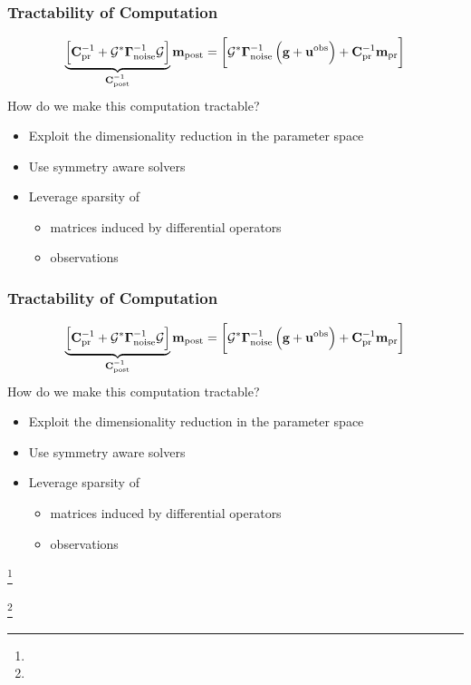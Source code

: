 \documentclass[
  pdf,
  10pt,
  xcolor={svgnames},
]{beamer}
\newcommand\blfootnote[1]{%
  \begingroup
  \renewcommand\thefootnote{}\footnote{\scriptsize #1}%
  \addtocounter{footnote}{-1}%
  \endgroup
}
\newcommand{\mc}[1]{\mathcal{#1}}
\newcommand{\mat}[1]{\mathbf{{#1}}}
\newcommand{\obs}{\mathbf{u}^{\rm obs}}
\begin{document}
\begin{frame}
  \frametitle{Tractability of Computation}
  \[
    \underbrace{\left[
        \mat{C}_{\rm pr}^{-1} + \mc{G}^* \vb{\Gamma}_{\rm noise}^{-1} \mc{G}
    \right]}_{\mat{C}_{\rm post}^{-1}}
    \vb{m}_{\rm post}
    =
    \left[
      \mc{G}^* \vb{\Gamma}_{\rm noise}^{-1} \left( \vb{g} + \obs \right)
      + \mat{C}_{\rm pr}^{-1} \vb{m}_{\rm pr}
    \right]
  \]
  How do we make this computation tractable?
  \pause
  \begin{itemize}[<+->]
    \item Exploit the dimensionality reduction in the parameter space
    \item Use symmetry aware solvers
    \item Leverage sparsity of 
      \begin{itemize}
        \item matrices induced by differential operators
        \item observations
      \end{itemize}
  \end{itemize}
\end{frame}
\begin{frame}
  \frametitle{Tractability of Computation}
  \[
    \underbrace{\left[
        \mat{C}_{\rm pr}^{-1} + \mc{G}^* \vb{\Gamma}_{\rm noise}^{-1} \mc{G}
    \right]}_{\mat{C}_{\rm post}^{-1}}
    \vb{m}_{\rm post}
    =
    \left[
      \mc{G}^* \vb{\Gamma}_{\rm noise}^{-1} \left( \vb{g} + \obs \right)
      + \mat{C}_{\rm pr}^{-1} \vb{m}_{\rm pr}
    \right]
  \]
  How do we make this computation tractable?
  \begin{itemize}
    \item Exploit the dimensionality reduction in the parameter space
    \item Use symmetry aware solvers
    \item Leverage sparsity of 
      \begin{itemize}
        \item matrices induced by differential operators
        \item observations
      \end{itemize}
  \end{itemize}
  \blfootnote{}
  \blfootnote{}
\end{frame}
\end{document}
